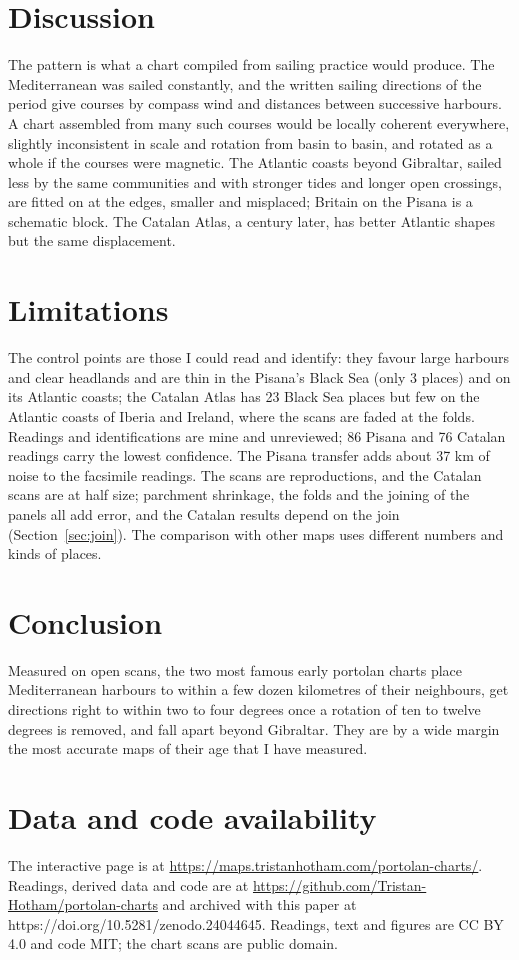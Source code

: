 \documentclass[11pt,a4paper]{article}
\begin{document}
\section{Discussion}
The pattern is what a chart compiled from sailing practice would produce. The Mediterranean was sailed constantly, and the written sailing directions of the period give courses by compass wind and distances between successive harbours. A chart assembled from many such courses would be locally coherent everywhere, slightly inconsistent in scale and rotation from basin to basin, and rotated as a whole if the courses were magnetic. The Atlantic coasts beyond Gibraltar, sailed less by the same communities and with stronger tides and longer open crossings, are fitted on at the edges, smaller and misplaced; Britain on the Pisana is a schematic block. The Catalan Atlas, a century later, has better Atlantic shapes but the same displacement.

\section{Limitations}\label{sec:limits}
The control points are those I could read and identify: they favour large harbours and clear headlands and are thin in the Pisana's Black Sea (only 3 places) and on its Atlantic coasts; the Catalan Atlas has 23 Black Sea places but few on the Atlantic coasts of Iberia and Ireland, where the scans are faded at the folds. Readings and identifications are mine and unreviewed; 86 Pisana and 76 Catalan readings carry the lowest confidence. The Pisana transfer adds about 37 km of noise to the facsimile readings. The scans are reproductions, and the Catalan scans are at half size; parchment shrinkage, the folds and the joining of the panels all add error, and the Catalan results depend on the join (Section~\ref{sec:join}). The comparison with other maps uses different numbers and kinds of places.

\section{Conclusion}
Measured on open scans, the two most famous early portolan charts place Mediterranean harbours to within a few dozen kilometres of their neighbours, get directions right to within two to four degrees once a rotation of ten to twelve degrees is removed, and fall apart beyond Gibraltar. They are by a wide margin the most accurate maps of their age that I have measured.

\section*{Data and code availability}
The interactive page is at \url{https://maps.tristanhotham.com/portolan-charts/}. Readings, derived data and code are at \url{https://github.com/Tristan-Hotham/portolan-charts} and archived with this paper at https://doi.org/10.5281/zenodo.24044645. Readings, text and figures are CC BY 4.0 and code MIT; the chart scans are public domain.
\end{document}
